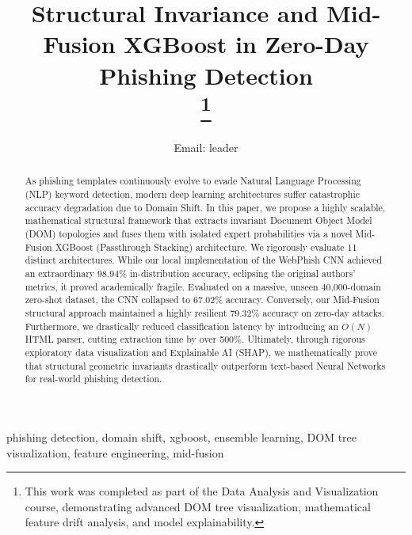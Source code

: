 \documentclass[conference]{IEEEtran}
\begin{document}
\title{Structural Invariance and Mid-Fusion XGBoost in Zero-Day Phishing Detection\\
\thanks{This work was completed as part of the Data Analysis and Visualization course, demonstrating advanced DOM tree visualization, mathematical feature drift analysis, and model explainability.}
}

\author{
Email: leader}

\maketitle

\begin{abstract}
As phishing templates continuously evolve to evade Natural Language Processing (NLP) keyword detection, modern deep learning architectures suffer catastrophic accuracy degradation due to Domain Shift. In this paper, we propose a highly scalable, mathematical structural framework that extracts invariant Document Object Model (DOM) topologies and fuses them with isolated expert probabilities via a novel Mid-Fusion XGBoost (Passthrough Stacking) architecture. We rigorously evaluate 11 distinct architectures. While our local implementation of the WebPhish CNN achieved an extraordinary 98.94\% in-distribution accuracy, eclipsing the original authors' metrics, it proved academically fragile. Evaluated on a massive, unseen 40,000-domain zero-shot dataset, the CNN collapsed to 67.02\% accuracy. Conversely, our Mid-Fusion structural approach maintained a highly resilient 79.32\% accuracy on zero-day attacks. Furthermore, we drastically reduced classification latency by introducing an $O(N)$ HTML parser, cutting extraction time by over 500\%. Ultimately, through rigorous exploratory data visualization and Explainable AI (SHAP), we mathematically prove that structural geometric invariants drastically outperform text-based Neural Networks for real-world phishing detection.
\end{abstract}

\begin{IEEEkeywords}
phishing detection, domain shift, xgboost, ensemble learning, DOM tree visualization, feature engineering, mid-fusion
\end{IEEEkeywords}
\end{document}
